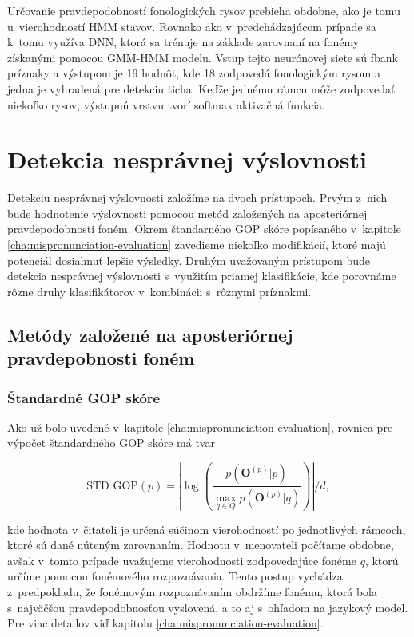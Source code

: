 \noindent Určovanie pravdepodobností fonologických rysov prebieha obdobne, ako je tomu u~vierohodností HMM stavov. Rovnako ako v~predchádzajúcom prípade sa k~tomu využíva DNN, ktorá sa trénuje na základe zarovnaní na fonémy získanými pomocou GMM-HMM modelu. Vstup tejto neurónovej siete sú fbank príznaky a výstupom je 19 hodnôt, kde 18 zodpovedá fonologickým rysom a jedna je vyhradená pre detekciu ticha. Keďže jednému rámcu môže zodpovedať niekoľko rysov, výstupnú vrstvu tvorí softmax aktivačná funkcia. 


\section{Detekcia nesprávnej výslovnosti}

Detekciu nesprávnej výslovnosti založíme na dvoch prístupoch. Prvým z~nich bude hodnotenie výslovnosti pomocou metód založených na aposteriórnej pravdepodobnosti foném. Okrem štandarného GOP skóre popísaného v~kapitole \ref{cha:mispronunciation-evaluation} zavedieme niekoľko modifikácií, ktoré majú potenciál dosiahnuť lepšie výsledky. Druhým uvažovaným prístupom bude detekcia nesprávnej výslovnosti s~využitím priamej klasifikácie, kde porovnáme rôzne druhy klasifikátorov v~kombinácii s~rôznymi príznakmi. 

\subsection{Metódy založené na aposteriórnej pravdepobnosti foném}

\subsubsection{Štandardné GOP skóre}

Ako už bolo uvedené v~kapitole \ref{cha:mispronunciation-evaluation}, rovnica pre výpočet štandardného GOP skóre má tvar

\begin{equation} \label{eq:std-gop}
    \text{STD GOP}(p) = \left| \log \left( \frac{p(\bm{O}^{(p)} | p)}{\max_{q \in Q} p(\bm{O}^{(p)} | q)} \right) \right| \bigg/ d,
\end{equation}

\noindent kde hodnota v~čitateli je určená súčinom vierohodností po jednotlivých rámcoch, ktoré sú dané núteným zarovnaním. Hodnotu v~menovateli počítame obdobne, avšak v~tomto prípade uvažujeme vierohodnosti zodpovedajúce fonéme $q$, ktorú určíme pomocou fonémového rozpoznávania. Tento postup vychádza z~predpokladu, že fonémovým rozpoznávaním obdržíme fonému, ktorá bola s~najväčšou pravdepodobnosťou vyslovená, a to aj s~ohľadom na jazykový model. Pre viac detailov viď kapitolu \ref{cha:mispronunciation-evaluation}.

